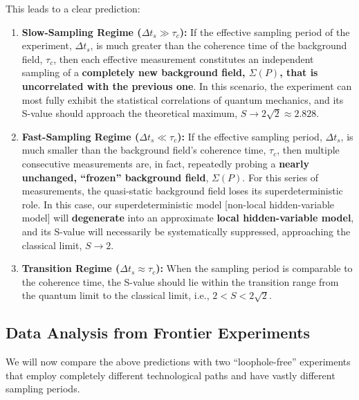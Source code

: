 \documentclass[11pt]{article}
\begin{document}
This leads to a clear prediction:

\begin{enumerate}
    \item \textbf{Slow-Sampling Regime ($\Delta t_s \gg \tau_c$):}
    If the effective sampling period of the experiment, $\Delta t_s$, is much greater than the coherence time of the background field, $\tau_c$, then each effective measurement constitutes an independent sampling of a \textbf{completely new background field, $\Sigma(P)$, that is uncorrelated with the previous one}. In this scenario, the experiment can most fully exhibit the statistical correlations of quantum mechanics, and its S-value should approach the theoretical maximum, \textbf{$S \to 2\sqrt{2} \approx 2.828$}.

    \item \textbf{Fast-Sampling Regime ($\Delta t_s \ll \tau_c$):}
    If the effective sampling period, $\Delta t_s$, is much smaller than the background field's coherence time, $\tau_c$, then multiple consecutive measurements are, in fact, repeatedly probing a \textbf{nearly unchanged, ``frozen'' background field}, $\Sigma(P)$. For this series of measurements, the quasi-static background field loses its superdeterministic role. In this case, our superdeterministic model [non-local hidden-variable model] will \textbf{degenerate} into an approximate \textbf{local hidden-variable model}, and its S-value will necessarily be systematically suppressed, approaching the classical limit, \textbf{$S \to 2$}.

    \item \textbf{Transition Regime ($\Delta t_s \approx \tau_c$):}
    When the sampling period is comparable to the coherence time, the S-value should lie within the transition range from the quantum limit to the classical limit, i.e., $2 < S < 2\sqrt{2}$.
\end{enumerate}

\subsection{Data Analysis from Frontier Experiments}

We will now compare the above predictions with two ``loophole-free'' experiments that employ completely different technological paths and have vastly different sampling periods.
\end{document}

